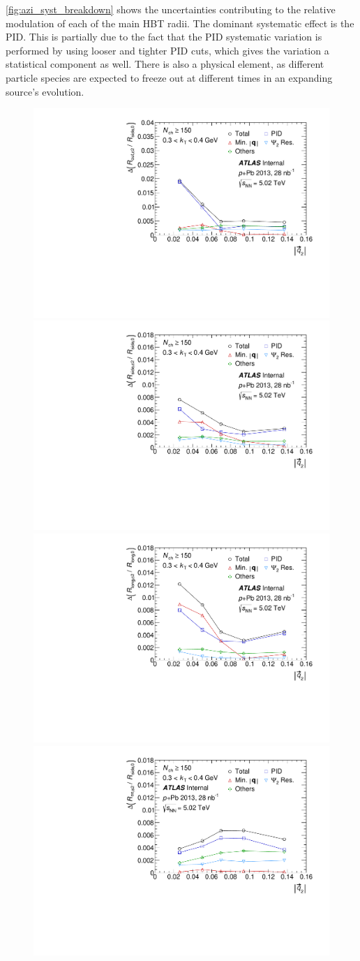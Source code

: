 \FloatBarrier
\cref{fig:azi_syst_breakdown} shows the uncertainties contributing to the relative modulation of each of the main HBT radii. The dominant systematic effect is the \ac{PID}. This is partially due to the fact that the \ac{PID} systematic variation is performed by using looser and tighter \ac{PID} cuts, which gives the variation a statistical component as well. There is also a physical element, as different particle species are expected to freeze out at different times in an expanding source's evolution.

\begin{figure}[t]
\centering
\includegraphics[width=.49\linewidth]{can_syst_breakdown_gr_u_Rout_vs_q2_kt2.pdf}
\includegraphics[width=.49\linewidth]{can_syst_breakdown_gr_u_Rside_vs_q2_kt2.pdf}\\
\includegraphics[width=.49\linewidth]{can_syst_breakdown_gr_u_Rlong_vs_q2_kt2.pdf}
\includegraphics[width=.49\linewidth]{can_syst_breakdown_gr_w_Ros_vs_q2_kt2.pdf}\\

\end{figure}

